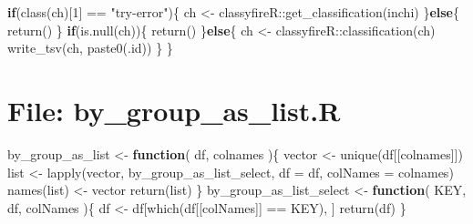 \documentclass[
]{article}
\newenvironment{Shaded}{\begin{snugshade}}{\end{snugshade}}
\newcommand{\AttributeTok}[1]{\textcolor[rgb]{0.77,0.63,0.00}{#1}}
\newcommand{\ControlFlowTok}[1]{\textcolor[rgb]{0.13,0.29,0.53}{\textbf{#1}}}
\newcommand{\DecValTok}[1]{\textcolor[rgb]{0.00,0.00,0.81}{#1}}
\newcommand{\FunctionTok}[1]{\textcolor[rgb]{0.00,0.00,0.00}{#1}}
\newcommand{\NormalTok}[1]{#1}
\newcommand{\OtherTok}[1]{\textcolor[rgb]{0.56,0.35,0.01}{#1}}
\newcommand{\SpecialCharTok}[1]{\textcolor[rgb]{0.00,0.00,0.00}{#1}}
\newcommand{\StringTok}[1]{\textcolor[rgb]{0.31,0.60,0.02}{#1}}
\begin{document}
\begin{Shaded}
\begin{Highlighting}[]
    \ControlFlowTok{if}\NormalTok{(}\FunctionTok{class}\NormalTok{(ch)[}\DecValTok{1}\NormalTok{] }\SpecialCharTok{==} \StringTok{"try{-}error"}\NormalTok{)\{}
\NormalTok{      ch }\OtherTok{\textless{}{-}}\NormalTok{ classyfireR}\SpecialCharTok{::}\FunctionTok{get\_classification}\NormalTok{(inchi)}
\NormalTok{    \}}\ControlFlowTok{else}\NormalTok{\{}
      \FunctionTok{return}\NormalTok{()}
\NormalTok{    \}}
    \ControlFlowTok{if}\NormalTok{(}\FunctionTok{is.null}\NormalTok{(ch))\{}
      \FunctionTok{return}\NormalTok{()}
\NormalTok{    \}}\ControlFlowTok{else}\NormalTok{\{}
\NormalTok{      ch }\OtherTok{\textless{}{-}}\NormalTok{ classyfireR}\SpecialCharTok{::}\FunctionTok{classification}\NormalTok{(ch)}
      \FunctionTok{write\_tsv}\NormalTok{(ch, }\FunctionTok{paste0}\NormalTok{(.id))}
\NormalTok{    \}}
\NormalTok{  \}}
\end{Highlighting}
\end{Shaded}

\hypertarget{file-by_group_as_list.r}{%
\section{File: by\_group\_as\_list.R}\label{file-by_group_as_list.r}}

\begin{Shaded}
\begin{Highlighting}[]
\NormalTok{by\_group\_as\_list }\OtherTok{\textless{}{-}}
  \ControlFlowTok{function}\NormalTok{(}
\NormalTok{           df,}
\NormalTok{           colnames}
\NormalTok{           )\{}
\NormalTok{    vector }\OtherTok{\textless{}{-}} \FunctionTok{unique}\NormalTok{(df[[colnames]])}
\NormalTok{    list }\OtherTok{\textless{}{-}} \FunctionTok{lapply}\NormalTok{(vector, by\_group\_as\_list\_select,}
                   \AttributeTok{df =}\NormalTok{ df,}
                   \AttributeTok{colNames =}\NormalTok{ colnames)}
    \FunctionTok{names}\NormalTok{(list) }\OtherTok{\textless{}{-}}\NormalTok{ vector}
    \FunctionTok{return}\NormalTok{(list)}
\NormalTok{  \}}
\NormalTok{by\_group\_as\_list\_select }\OtherTok{\textless{}{-}} 
  \ControlFlowTok{function}\NormalTok{(}
\NormalTok{           KEY,}
\NormalTok{           df,}
\NormalTok{           colNames}
\NormalTok{           )\{}
\NormalTok{    df }\OtherTok{\textless{}{-}}\NormalTok{ df[}\FunctionTok{which}\NormalTok{(df[[colNames]] }\SpecialCharTok{==}\NormalTok{ KEY), ]}
    \FunctionTok{return}\NormalTok{(df)}
\NormalTok{  \}}
\end{Highlighting}
\end{Shaded}
\end{document}
